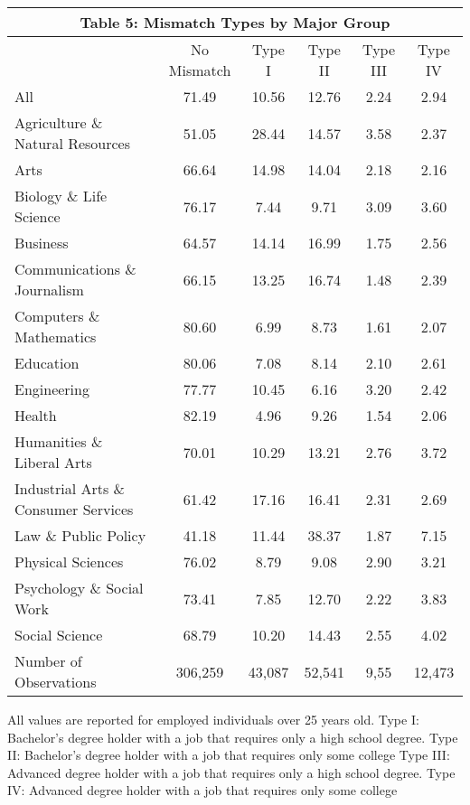 \documentclass[11pt]{article}
\theoremstyle{definition}
\begin{document}
\small{
\vspace{2.5mm}
\noindent
\begin{center}
\begin{tabular}{l c c c c c}
\hline\hline
\multicolumn{6}{c}{\textbf{Table 5: Mismatch Types by Major Group}} \\
\hline
 & No Mismatch & Type I & Type II & Type III & Type IV   \\
\hline
All & 71.49 & 10.56 & 12.76 & 2.24 & 2.94 \\
Agriculture \& Natural Resources & 51.05 & 28.44 & 14.57 & 3.58 & 2.37  \\
Arts & 66.64 & 14.98 & 14.04 & 2.18 & 2.16  \\
Biology \& Life Science & 76.17 & 7.44 & 9.71 & 3.09 & 3.60 \\
Business & 64.57 & 14.14 & 16.99 & 1.75 & 2.56 \\
Communications \& Journalism & 66.15 & 13.25 & 16.74 & 1.48 & 2.39 \\
Computers \& Mathematics & 80.60 & 6.99 & 8.73 & 1.61 & 2.07 \\
Education & 80.06 & 7.08 & 8.14 & 2.10 & 2.61 \\
Engineering & 77.77 & 10.45 & 6.16 & 3.20 & 2.42 \\
Health & 82.19 & 4.96 & 9.26 & 1.54 & 2.06 \\
Humanities \& Liberal Arts & 70.01 & 10.29 & 13.21 & 2.76 & 3.72 \\
Industrial Arts \& Consumer Services & 61.42 & 17.16 & 16.41 & 2.31 & 2.69 \\
Law \& Public Policy & 41.18 & 11.44 & 38.37 & 1.87 & 7.15 \\
Physical Sciences & 76.02 & 8.79 & 9.08 & 2.90 & 3.21 \\
Psychology \& Social Work & 73.41 & 7.85 & 12.70 & 2.22 & 3.83 \\
Social Science & 68.79 & 10.20 & 14.43 & 2.55 & 4.02 \\
\hline
Number of Observations & 306,259 & 43,087 & 52,541 & 9,55 & 12,473 \\
\hline\hline
\end{tabular} 
\end{center}} 
All values are reported for employed individuals over 25 years old. Type I: Bachelor's degree holder with a job that requires only a high school degree.  Type II: Bachelor's degree holder with a job that requires only some college  Type III: Advanced degree holder with a job that requires only a high school degree.  Type IV: Advanced degree holder with a job that requires only some college  
\end{document}
